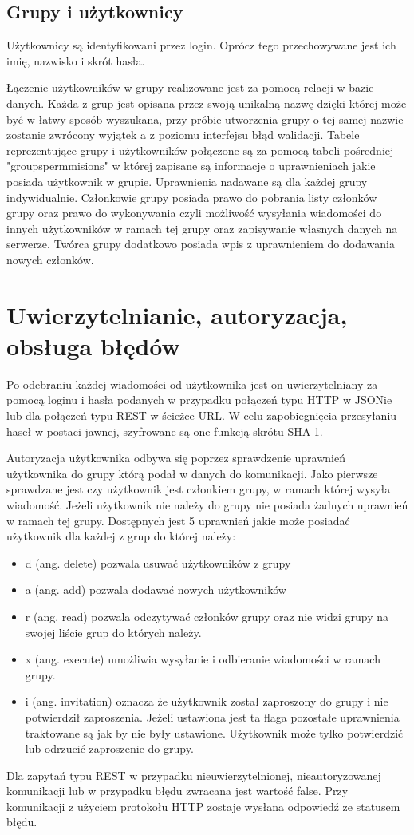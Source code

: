 \documentclass[11pt,a4paper,polish,thesis]{dcsbook}
\begin{document}
\subsection{Grupy i użytkownicy}

Użytkownicy są identyfikowani przez login. Oprócz tego przechowywane jest ich imię, nazwisko i skrót hasła.

Łączenie użytkowników w grupy realizowane jest za pomocą relacji w bazie danych. 
Każda z grup jest opisana przez swoją unikalną nazwę dzięki której może być w łatwy sposób wyszukana, przy próbie utworzenia grupy o tej samej nazwie zostanie zwrócony wyjątek a z poziomu interfejsu błąd walidacji.
Tabele reprezentujące grupy i użytkowników połączone są za pomocą tabeli pośredniej "groupspermmisions" w której zapisane są informacje o uprawnieniach jakie posiada użytkownik w grupie. 
Uprawnienia nadawane są dla każdej grupy indywidualnie. 
Członkowie grupy posiada prawo do pobrania listy członków grupy oraz prawo do wykonywania czyli możliwość wysyłania wiadomości do innych użytkowników w ramach tej grupy oraz zapisywanie własnych danych na serwerze.
Twórca grupy dodatkowo posiada wpis z uprawnieniem do dodawania nowych członków. 

\section{Uwierzytelnianie, autoryzacja, obsługa błędów} 
Po odebraniu każdej wiadomości od użytkownika jest on uwierzytelniany za pomocą loginu i hasła podanych w przypadku połączeń typu HTTP w JSONie lub dla połączeń typu REST w ścieżce URL.
W celu zapobiegnięcia przesyłaniu haseł w postaci jawnej, szyfrowane są one funkcją skrótu SHA-1.

Autoryzacja użytkownika odbywa się poprzez sprawdzenie uprawnień użytkownika do grupy którą podał w danych do komunikacji. 
Jako pierwsze sprawdzane jest czy użytkownik jest członkiem grupy, w ramach której wysyła wiadomość. 
Jeżeli użytkownik nie należy do grupy nie posiada żadnych uprawnień w ramach tej grupy.
Dostępnych jest 5 uprawnień jakie może posiadać użytkownik dla każdej z grup do której należy:
\begin{itemize}
\item d (ang. delete) pozwala usuwać użytkowników z grupy
\item a (ang. add) pozwala dodawać nowych użytkowników
\item r (ang. read) pozwala odczytywać członków grupy oraz nie widzi grupy na swojej liście grup do których należy.
\item x (ang. execute) umożliwia wysyłanie i odbieranie wiadomości w ramach grupy.
\item i (ang. invitation) oznacza że użytkownik został zaproszony do grupy i nie potwierdził zaproszenia. Jeżeli ustawiona jest ta flaga pozostałe uprawnienia traktowane są jak by nie były ustawione. Użytkownik może tylko potwierdzić lub odrzucić zaproszenie do grupy.
\end{itemize}
Dla zapytań typu REST w przypadku nieuwierzytelnionej, nieautoryzowanej komunikacji lub w przypadku błędu zwracana jest wartość false.
Przy komunikacji z użyciem protokołu HTTP zostaje wysłana odpowiedź ze statusem błędu.
\end{document}
